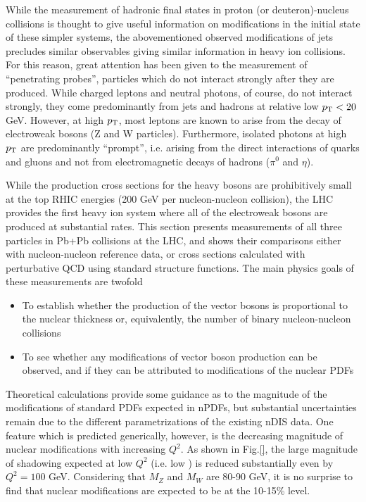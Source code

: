 While the measurement of hadronic final states in proton (or deuteron)-nucleus collisions
is thought to give useful information on modifications in the initial state of these
simpler systems, the abovementioned observed modifications of jets precludes similar
observables giving similar information in heavy ion collisions.
For this reason, great attention has been given to the measurement of 
``penetrating probes'', particles which do not interact strongly after they are produced.
While charged leptons and neutral photons, of course, 
do not interact strongly, they come predominantly from
jets and hadrons at relative low $\mbox{$p_{\mathrm{T}}$} < 20$ GeV.
However, at high $\mbox{$p_{\mathrm{T}}$}$, most leptons are known to arise from the decay of electroweak
bosons (Z and W particles).  Furthermore, isolated photons at high $\mbox{$p_{\mathrm{T}}$}$ are predominantly 
``prompt'', i.e. arising from the direct interactions of quarks and gluons and not from
electromagnetic decays of hadrons ($\pi^0$ and $\eta$).

While the production cross sections for the heavy bosons are prohibitively small at the
top RHIC energies (200 GeV per nucleon-nucleon collision), the LHC provides the first
heavy ion system where all of the electroweak bosons are produced at substantial rates.
This section presents measurements of all three particles in Pb+Pb collisions at the LHC,
and shows their comparisons either with nucleon-nucleon reference data, or cross sections
calculated with perturbative QCD using standard structure functions.
The main physics goals of these measurements are twofold
\begin{itemize}
\item To establish whether the production of the vector bosons is proportional to the 
nuclear thickness or, equivalently, the number of binary nucleon-nucleon collisions
\item To see whether any modifications of vector boson production can be observed,
and if they can be attributed to modifications of the nuclear PDFs
\end{itemize}
Theoretical calculations provide some guidance as to the magnitude of the modifications
of standard PDFs expected in nPDFs, but substantial uncertainties remain due to the 
different parametrizations of the existing nDIS data.
One feature which is predicted generically, however, is the decreasing magnitude of
nuclear modifications with increasing $Q^2$.  As shown in Fig.\ref{}, the large magnitude
of shadowing expected at low $Q^2$ (i.e. low \pT) is reduced substantially even by 
$Q^2=100$ GeV.  Considering that $M_Z$ and $M_W$ are 80-90 GeV, it is no surprise to 
find that nuclear modifications are expected to be at the 10-15\% level.

